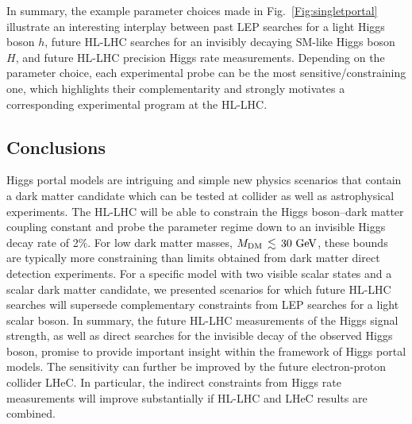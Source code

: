 \documentclass[../report.tex]{subfiles}
\begin{document}
In summary, the example parameter choices made in Fig.~\ref{Fig:singletportal} illustrate an interesting interplay between past LEP searches for a light Higgs boson $h$, future HL-LHC searches for an invisibly decaying SM-like Higgs boson $H$, and future HL-LHC precision Higgs rate measurements. Depending on the parameter choice, each experimental probe can be the most sensitive/constraining one, which highlights their complementarity and strongly motivates a corresponding experimental program at the HL-LHC. 



\subsection{Conclusions}
\label{sec6:conclusions}

Higgs portal models are intriguing and simple new physics scenarios that contain a dark matter candidate which can be tested at collider as well as astrophysical experiments. The HL-LHC will be able to constrain the Higgs boson--dark matter coupling constant and probe the parameter regime down to an invisible Higgs decay rate of 2$\%$. For low dark matter masses, $M_\text{DM}\,\lesssim\,30~\text{GeV}$, these bounds are typically more constraining than limits obtained from dark matter direct detection experiments. For a specific model with two visible scalar states and a scalar dark matter candidate, we presented scenarios for which future HL-LHC {searches} will supersede complementary constraints from LEP searches for a light scalar boson. In summary, the future HL-LHC measurements of the Higgs signal strength, as well as {direct searches} for the invisible decay of the observed Higgs boson, promise to provide important insight within the framework of Higgs portal models. {The sensitivity can further be improved by the future electron-proton collider LHeC. In particular, the indirect constraints from Higgs rate measurements will improve substantially if HL-LHC and LHeC results are combined.}
\end{document}
